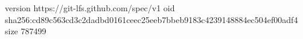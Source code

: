 version https://git-lfs.github.com/spec/v1
oid sha256:cd89c563cd3c2dadbd0161ceec25eeb7bbeb9183c4239148884ec504ef00adf4
size 787499
